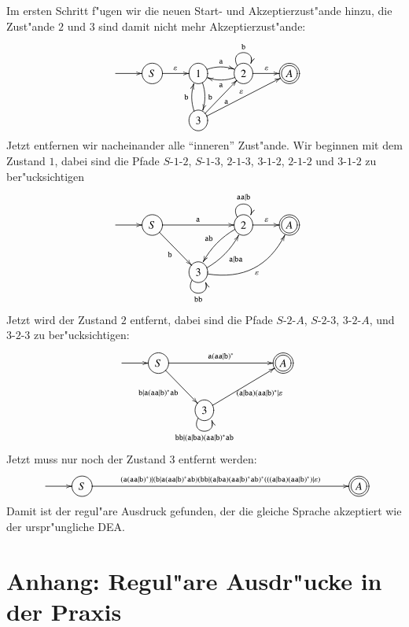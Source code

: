 Im ersten Schritt f"ugen wir die neuen Start- und Akzeptierzust"ande 
hinzu, die Zust"ande $2$ und $3$ sind damit nicht mehr Akzeptierzust"ande:
\[
\entrymodifiers={++[o][F]}
\xymatrix{
*+\txt{}\ar[r]
	&S\ar[r]^{\varepsilon}
		&{1}\ar@/^/[r]^{\tt a} \ar@/^/[d]^{\tt b}
			&{2} \ar@(ul,ur)^{\tt b} \ar@/^/[l]^{\tt a}\ar[r]^{\varepsilon}
				&*++[o][F=]{A}
\\
*+\txt{}
	&*+\txt{}
		&{3} \ar[ur]_{\tt a} \ar@/^/[u]^{\tt b} \ar[urr]^{\varepsilon}
}
\]
Jetzt entfernen wir nacheinander alle ``inneren'' Zust"ande. Wir beginnen mit
dem Zustand $1$, dabei sind die Pfade
$S$-$1$-$2$,
$S$-$1$-$3$,
$2$-$1$-$3$,
$3$-$1$-$2$,
$2$-$1$-$2$
und $3$-$1$-$2$
zu ber"ucksichtigen
\[
\entrymodifiers={++[o][F]}
\xymatrix{
*+\txt{}\ar[r]
	&S\ar[rr]^{\tt a} \ar[dr]_{\tt b}
		&*+\txt{}
			&{2} \ar@(ul,ur)^{\tt aa|b} \ar@/_/[dl]_{\tt ab} \ar[r]^{\varepsilon}
				&*++[o][F=]{A}
\\
*+\txt{}
	&*+\txt{}
		&{3} \ar@/_/[ur]_{\tt a|ba} \ar@/_20pt/[urr]_{\varepsilon} \ar@(dl,dr)_{\tt bb}
}
\]
Jetzt wird der Zustand $2$ entfernt, dabei sind die Pfade 
$S$-$2$-$A$,
$S$-$2$-$3$,
$3$-$2$-$A$,
und
$3$-$2$-$3$
zu ber"ucksichtigen:
\[
\entrymodifiers={++[o][F]}
\xymatrix{
*+\txt{}\ar[r]
	&S\ar[rrr]^{\tt a(aa|b)^*} \ar[dr]_{\tt b|a(aa|b)^*ab}
		&*+\txt{}
			&*+\txt{}
				&*++[o][F=]{A}
\\
*+\txt{}
	&*+\txt{}
		&{3} \ar[urr]_{{\tt (a|ba)(aa|b)^*}|\varepsilon} \ar@(dl,dr)_{{\tt bb|(a|ba)(aa|b)^*ab}}
}
\]
Jetzt muss nur noch der Zustand $3$ entfernt werden:
\[
\entrymodifiers={++[o][F]}
\xymatrix{
*+\txt{}\ar[r]
	&S\ar[rrrrrrrr]^{\tt (a(aa|b)^*)|(b|a(aa|b)^*ab)(bb|(a|ba)(aa|b)^*ab)^*(((a|ba)(aa|b)^*)|\varepsilon)}
		&*+\txt{}
			&*+\txt{}
			&*+\txt{}
			&*+\txt{}
			&*+\txt{}
			&*+\txt{}
			&*+\txt{}
				&*++[o][F=]{A}
}
\]
Damit ist der regul"are Ausdruck gefunden, der die gleiche Sprache
akzeptiert wie der urspr"ungliche DEA.

\section{Anhang: Regul"are Ausdr"ucke in der Praxis\label{regulaer:praxis}}
